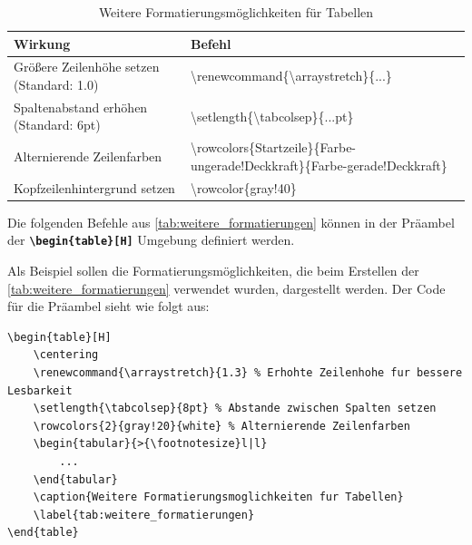 \begin{table}[H]
    \centering
    \renewcommand{\arraystretch}{1.3} %
    \setlength{\tabcolsep}{8pt} %
    \begin{tabular}{>{\footnotesize}l|l}
        \toprule
        \rowcolor{gray!40} %
        \textbf{Wirkung}                          & \textbf{Befehl}                                                                                           \\
        \midrule
        Größere Zeilenhöhe setzen (Standard: 1.0) & \textbackslash renewcommand\{\textbackslash arraystretch\}\{...\}                                         \\
        Spaltenabstand erhöhen (Standard: 6pt)    & \textbackslash setlength\{\textbackslash tabcolsep\}\{...pt\}                                             \\
        Alternierende Zeilenfarben                & \scriptsize{\textbackslash rowcolors\{Startzeile\}\{Farbe-ungerade!Deckkraft\}\{Farbe-gerade!Deckkraft\}} \\
        Kopfzeilenhintergrund setzen              & \textbackslash rowcolor\{gray!40\}                                                                        \\
        \bottomrule
    \end{tabular}
    \caption{Weitere Formatierungsmöglichkeiten für Tabellen}
    \label{tab:weitere_formatierungen}
\end{table}

Die folgenden Befehle aus \autoref{tab:weitere_formatierungen} können in der Präambel der \texttt{\textbf{\textbackslash begin\{table\}[H]}} Umgebung definiert werden.

Als Beispiel sollen die Formatierungsmöglichkeiten, die beim Erstellen der \autoref{tab:weitere_formatierungen} verwendet wurden, dargestellt werden.
Der Code für die Präambel sieht wie folgt aus:

\begin{lstlisting}[language={[LaTeX]TeX}, basicstyle=\small]
\begin{table}[H]
    \centering
    \renewcommand{\arraystretch}{1.3} % Erhohte Zeilenhohe fur bessere Lesbarkeit
    \setlength{\tabcolsep}{8pt} % Abstande zwischen Spalten setzen
    \rowcolors{2}{gray!20}{white} % Alternierende Zeilenfarben
    \begin{tabular}{>{\footnotesize}l|l}
        ...
    \end{tabular}
    \caption{Weitere Formatierungsmoglichkeiten fur Tabellen}
    \label{tab:weitere_formatierungen}
\end{table}
\end{lstlisting}

